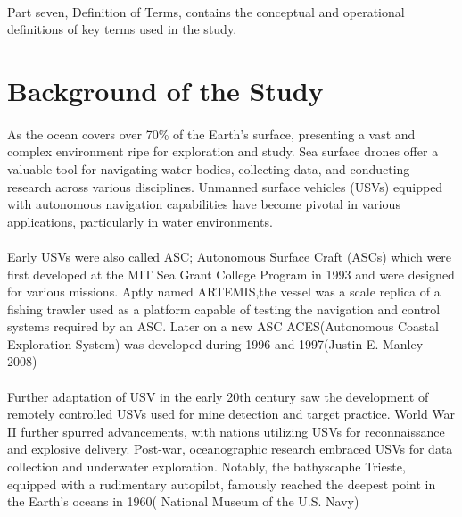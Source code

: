 \paragraph{} Part seven, Definition of Terms, contains the conceptual and operational definitions of key terms used in the study.

\section{Background of the Study}
\paragraph{} As the ocean covers over 70\% of the Earth's surface, presenting a vast and complex environment ripe for exploration and study. 
            Sea surface drones offer a valuable tool for navigating water bodies, collecting data, and conducting research across various disciplines. 
            Unmanned surface vehicles (USVs) equipped with autonomous navigation capabilities have become pivotal in various applications, particularly 
            in water environments.

\paragraph{} Early USVs were also called ASC; Autonomous Surface Craft (ASCs) which were first developed at the MIT Sea Grant College Program in 1993 and 
            were designed for various missions. Aptly named ARTEMIS,the vessel was a scale replica of a fishing trawler used as a platform capable of 
            testing the navigation and control systems required by an ASC. Later on a new ASC ACES(Autonomous Coastal Exploration System) was developed 
            during 1996 and 1997(Justin E. Manley 2008)

\paragraph{} Further adaptation of USV in the early 20th century saw the development of remotely controlled USVs used for mine detection and target 
            practice. World War II further spurred advancements, with nations utilizing USVs for reconnaissance and explosive delivery. Post-war, 
            oceanographic research embraced USVs for data collection and underwater exploration. Notably, the bathyscaphe Trieste, equipped with a 
            rudimentary autopilot, famously reached the deepest point in the Earth's oceans in 1960( National Museum of the U.S. Navy)
          
